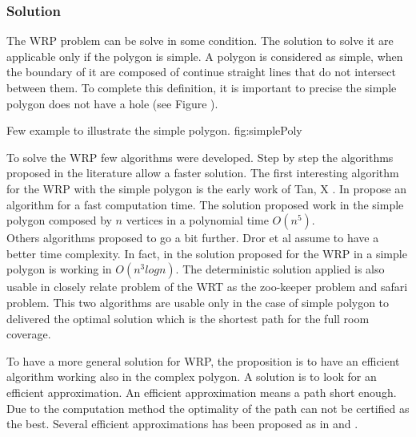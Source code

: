 \subsubsection{Solution} 

The WRP problem can be solve in some condition. The solution to solve it are applicable only if the polygon is simple. A polygon is considered as simple, when the boundary of it are composed of continue straight lines that do not intersect between them. To complete this definition, it is important to precise the simple polygon does not have a hole (see Figure ). 
 \begin{mfigures}[!]
{Few example to illustrate the simple polygon. }{fig:simplePoly} \centering
{}
\hspace{1cm}
\hspace{1cm}
\end{mfigures}	

To solve the WRP few algorithms were developed. Step by step the algorithms proposed in the literature allow a faster solution. The first interesting algorithm for the WRP with the simple polygon is the early work of Tan, X \cite{234*tan2001}. In \citep{234*tan2001}  propose an algorithm for a fast computation time. The solution proposed work in the simple polygon composed by $n$ vertices in a polynomial time $O(n^5)$. \\
Others algorithms proposed to go a bit further. Dror et al \cite{233*dror2003} assume to have a better  time complexity. In fact, in \cite{233*dror2003} the solution proposed for the WRP in a simple polygon is working in $O(n^3 log n)$.  The deterministic solution applied is also usable in closely relate problem of the WRT as the zoo-keeper problem and safari problem.
This two algorithms \citep{234*tan2001,233*dror2003} are usable only in the case of simple polygon to delivered the optimal solution which is the shortest path for the full room coverage. 

To have a more general solution for WRP, the proposition is to have an efficient algorithm working also in the complex polygon. A solution is to look for an efficient approximation. An efficient approximation means a path short enough.  Due to the computation method the optimality of the path can not be certified as the best.
Several efficient approximations has been proposed as in \citep{235*faigl2010} and \citep{53*packer2008}. 

